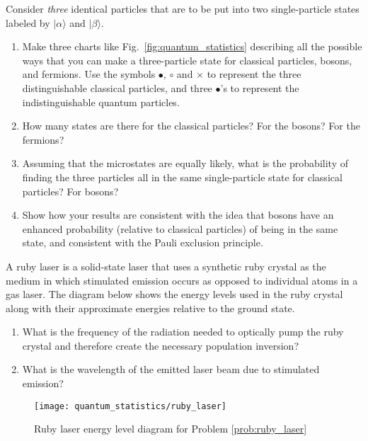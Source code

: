 \begin{problem}
  Consider \textit{three} identical particles that are to be put into
  two single-particle states labeled by $|\alpha\rangle$ and
  $|\beta\rangle$.
  \begin{enumerate}
  \item Make three charts like Fig.~\ref{fig:quantum_statistics}
    describing all the possible ways that you can make a
    three-particle state for classical particles, bosons, and
    fermions.  Use the symbols $\bullet$, $\circ$ and $\times$ to
    represent the three distinguishable classical particles, and three
    $\bullet$'s to represent the indistinguishable quantum particles.
  \item How many states are there for the classical particles?  For
    the bosons?  For the fermions?
  \item Assuming that the microstates are equally likely, what is the
    probability of finding the three particles all in the same
    single-particle state for classical particles?  For bosons?
  \item Show how your results are consistent with the idea that bosons have an
    enhanced probability (relative to classical particles) of being in
    the same state, and consistent with the Pauli exclusion principle.
  \end{enumerate}
\end{problem}


\begin{problem}
\label{prob:ruby_laser}
A ruby laser is a solid-state laser that uses a synthetic ruby crystal
as the medium in which stimulated emission occurs as opposed to
individual atoms in a gas laser.  The diagram below shows the energy
levels used in the ruby crystal along with their approximate energies
relative to the ground state.
\begin{enumerate}
\item What is the frequency of the radiation needed to optically pump
  the ruby crystal and therefore create the necessary population
  inversion?
\item What is the wavelength of the emitted laser beam due to
  stimulated emission?
\end{enumerate}

\begin{figure}[h]
\begin{center}
\texttt{[image: quantum\_statistics/ruby\_laser]}
\caption{Ruby laser energy level diagram for Problem \ref{prob:ruby_laser}}
\label{fig:ruby_laser}
\end{center}
\end{figure}

\end{problem}


